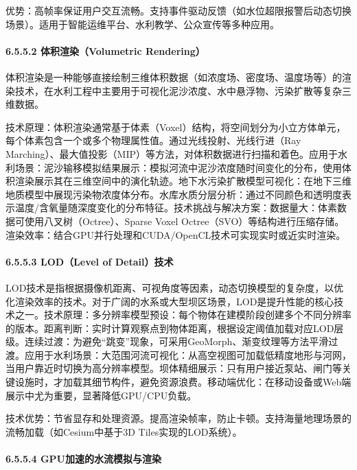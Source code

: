优势：高帧率保证用户交互流畅。支持事件驱动反馈（如水位超限报警后动态切换场景）。适用于智能运维平台、水利教学、公众宣传等多种应用。

\hypertarget{ux4f53ux79efux6e32ux67d3volumetric-rendering}{%
\paragraph{6.5.5.2 体积渲染（Volumetric Rendering）}\label{ux4f53ux79efux6e32ux67d3volumetric-rendering}}

体积渲染是一种能够直接绘制三维体积数据（如浓度场、密度场、温度场等）的渲染技术，在水利工程中主要用于可视化泥沙浓度、水中悬浮物、污染扩散等复杂三维数据。

技术原理：体积渲染通常基于体素（Voxel）结构，将空间划分为小立方体单元，每个体素包含一个或多个物理属性值。通过光线投射、光线行进（Ray Marching）、最大值投影（MIP）等方法，对体积数据进行扫描和着色。应用于水利场景：泥沙输移模拟结果展示：模拟河流中泥沙浓度随时间变化的分布，使用体积渲染展示其在三维空间中的演化轨迹。地下水污染扩散模型可视化：在地下三维地质模型中展现污染物浓度体分布。水库水质分层分析：通过不同颜色和透明度表示温度/含氧量随深度变化的分布特征。技术挑战与解决方案：数据量大：体素数据可使用八叉树（Octree）、Sparse Voxel Octree（SVO）等结构进行压缩存储。渲染效率：结合GPU并行处理和CUDA/OpenCL技术可实现实时或近实时渲染。

\hypertarget{lodlevel-of-detailux6280ux672f}{%
\paragraph{6.5.5.3 LOD（Level of Detail）技术}\label{lodlevel-of-detailux6280ux672f}}

LOD技术是指根据摄像机距离、可视角度等因素，动态切换模型的复杂度，以优化渲染效率的技术。对于广阔的水系或大型坝区场景，LOD是提升性能的核心技术之一。技术原理：多分辨率模型预设：每个物体在建模阶段创建多个不同分辨率的版本。距离判断：实时计算观察点到物体距离，根据设定阈值加载对应LOD层级。连续过渡：为避免``跳变''现象，可采用GeoMorph、渐变纹理等方法平滑过渡。应用于水利场景：大范围河流可视化：从高空视图可加载低精度地形与河网，当用户靠近时切换为高分辨率模型。坝体精细展示：只有用户接近泵站、闸门等关键设施时，才加载其细节构件，避免资源浪费。移动端优化：在移动设备或Web端展示中尤为重要，显著降低GPU/CPU负载。

技术优势：节省显存和处理资源。提高渲染帧率，防止卡顿。支持海量地理场景的流畅加载（如Cesium中基于3D Tiles实现的LOD系统）。

\hypertarget{gpuux52a0ux901fux7684ux6c34ux6d41ux6a21ux62dfux4e0eux6e32ux67d3}{%
\paragraph{6.5.5.4 GPU加速的水流模拟与渲染}\label{gpuux52a0ux901fux7684ux6c34ux6d41ux6a21ux62dfux4e0eux6e32ux67d3}}


